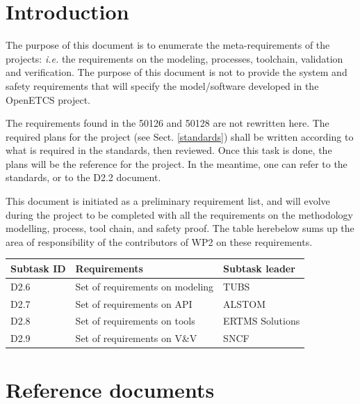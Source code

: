 \documentclass{template/openetcs_article}
\begin{document}
\newenvironment{justif}{
	\begin{quote}
	\begin{itshape}Justification. 
}{
	\end{itshape}
	\end{quote}
}


\def\reqt{R-WP2/D2.6}


\section{Introduction}
The purpose of this document is to enumerate the meta-requirements of the projects: \emph{i.e.} 
the requirements on the modeling, processes, toolchain, validation and verification. The purpose of this document is 
not to provide the system and safety requirements that will specify the model/software 
developed in the OpenETCS project.

The requirements found in the 50126 and 50128 are not rewritten here. The required plans for the 
project (see Sect. \ref{standards}) shall be written according to what is required in the standards,
then reviewed. Once this task is done, the plans will be the reference for the project.
In the meantime, one can refer to the standards, or to the D2.2 document.

This document is initiated as a preliminary requirement list, and will evolve during the project 
to be completed with all the requirements on the methodology
modelling, process, tool chain, and safety proof. The table herebelow sums up the area of responsibility
of the contributors of WP2 on these requirements.


\begin{tabular}{|l|l|l|}
\hline
Subtask ID & Requirements & Subtask leader \\
\hline
D2.6 & Set of requirements on modeling & TUBS  \\
\hline
D2.7 & Set of requirements on API & ALSTOM  \\
\hline
D2.8 &  Set of requirements on tools & ERTMS Solutions  \\
\hline
D2.9 & Set of requirements on V\&V & SNCF \\ 
\hline
\end{tabular}

\section{Reference documents}
\end{document}
